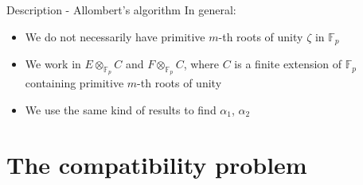 \documentclass[xcolor=x11names,compress]{beamer}
\theoremstyle{break}
\theoremstyle{sc}
\theoremstyle{definition}
\theoremstyle{remark}
\begin{document}
\begin{frame}{Description - Allombert's algorithm}
  In general:
  \begin{itemize}
    \item We do not necessarily have primitive $m$-th roots of unity $\zeta$ in $\mathbb{F}_p$
    \item We work in $E\otimes_{\mathbb{F}_p}C$ and
      $F\otimes_{\mathbb{F}_p}C$, where $C$ is a finite extension of
      $\mathbb{F}_p$ containing primitive $m$-th roots of unity
    \item We use the same kind of results to find $\alpha_1$, $\alpha_2$
  \end{itemize}
  
\end{frame}

\section{The compatibility problem}
\end{document}
